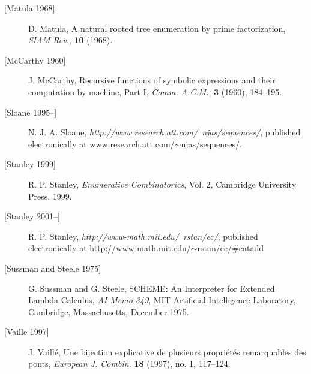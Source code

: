 \documentclass[11pt]{article} %
\begin{document}
\begin{description}
\item[{[Matula 1968]}] D. Matula, A natural rooted tree enumeration by prime factorization,
\emph{SIAM Rev.}, {\bf 10} (1968).

\item[{[McCarthy 1960]}]
J. McCarthy,
Recursive functions of symbolic expressions and their computation by machine, Part I,
{\em Comm. A.C.M.}, {\bf 3} (1960), 184--195.

\item[{[Sloane 1995--]}]
N. J. A. Sloane,
{\em {}
{http://www.research.att.com/~njas/sequences/}},
published electronically at www.research.att.com/$\sim$njas/sequences/.

\item[{[Stanley 1999]}]
R. P. Stanley,
{\em Enumerative Combinatorics},
Vol. 2, Cambridge University Press, 1999.

\item[{[Stanley 2001--]}]
R. P. Stanley,
{\em {}
{http://www-math.mit.edu/~rstan/ec/}},
\newline
published electronically at http://www-math.mit.edu/$\sim$rstan/ec/\#catadd

\item[{[Sussman and Steele 1975]}]
G. Sussman and G. Steele,
SCHEME: An Interpreter for Extended Lambda Calculus,
{\em AI Memo 349},
MIT Artificial Intelligence Laboratory,
Cambridge, Massachusetts, December 1975.

\item[{[Vaille 1997]}] J. Vaill\'{e}, Une bijection explicative de plusieurs 
propri\'{e}t\'{e}s remarquables des ponts, 
\emph{European J. Combin.} \textbf{18} (1997), no. 1, 117--124. 


\end{description}
\end{document}
